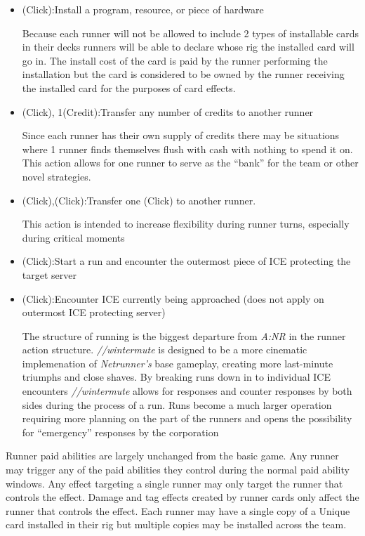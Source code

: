 \documentclass[titlepage]{article}
\begin{document}
\begin{itemize}
	\item (Click):Install a program, resource, or piece of hardware

		Because each runner will not be allowed to include 2 types of installable cards in their decks runners will be able to declare whose rig the installed card will go in. The install cost of the card is paid by the runner performing the installation but the card is considered to be owned by the runner receiving the installed card for the purposes of card effects. 

	\item (Click), 1(Credit):Transfer any number of credits to another runner

		Since each runner has their own supply of credits there may be situations where 1 runner finds themselves flush with cash with nothing to spend it on. This action allows for one runner to serve as the ``bank'' for the team or other novel strategies.

	\item (Click),(Click):Transfer one (Click) to another runner.

		This action is intended to increase flexibility during runner turns, especially during critical moments

	\item (Click):Start a run and encounter the outermost piece of ICE protecting the target server
	\item (Click):Encounter ICE currently being approached (does not apply on outermost ICE protecting server)

		The structure of running is the biggest departure from \emph{A:NR} in the runner action structure. \emph{//wintermute} is designed to be a more cinematic implemenation of \emph{Netrunner's} base gameplay, creating more last-minute triumphs and close shaves. By breaking runs down in to individual ICE encounters \emph{//wintermute} allows for responses and counter responses by both sides during the process of a run. Runs become a much larger operation requiring more planning on the part of the runners and opens the possibility for ``emergency'' responses by the corporation
\end{itemize}

Runner paid abilities are largely unchanged from the basic game. Any runner may trigger any of the paid abilities they control during the normal paid ability windows. Any effect targeting a single runner may only target the runner that controls the effect. Damage and tag effects created by runner cards only affect the runner that controls the effect. Each runner may have a single copy of a Unique card installed in their rig but multiple copies may be installed across the team.
\end{document}
